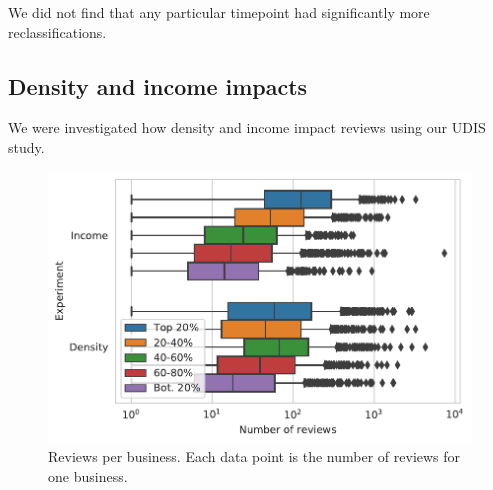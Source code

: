 
We did not find that any particular timepoint had significantly more reclassifications.










\subsection{Density and income impacts}

We were investigated how density and income impact reviews using our UDIS study.



\begin{figure}[t]
    \centering
    \includegraphics[width=0.9\columnwidth]{chapters/reviews/figures/reviews_per_business_stratified.pdf}
    \caption{Reviews per business. Each data point is the number of reviews for one business. }
    \label{fig:reviews_per_business_stratified}
\end{figure}

